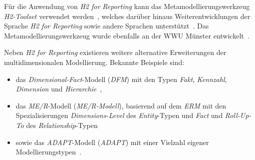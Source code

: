 \documentclass[
  language=german, %
  type=bachelor,%
  ngerman
]{isthesis}
\begin{document}
\begin{content}
	Für die Anwendung von \textit{H2 for Reporting} kann das
	Metamodellierungswerkzeug \textit{H2-Toolset} verwendet werden~\cite[][S.
	33]{fleischer2013konstruktion}, welches darüber hinaus Weiterentwicklungen
	der Sprache \textit{H2 for Reporting} sowie andere Sprachen
	unterstützt~\cite[][S. 86]{becker2012fachkonzeptionelle}. Das
	Metamodellierungswerkzeug wurde ebenfalls an der \acrshort{WWU} Münster
	entwickelt~\cite[][S.  34]{becker2007h2}.


	Neben \textit{H2 for Reporting} existieren weitere alternative Erweiterungen
	der multidimensionalen Modellierung. Bekannte Beispiele sind:

  \begin{itemize}
    \item das \textit{Dimensional-Fact}-Modell (\textit{\acrshort{DFM}}) mit den Typen
      \textit{Fakt}, \textit{Kennzahl}, \textit{Dimension} und
      \textit{Hierarchie}~\cite[][]{golfarelli1998dimensional}, 
    \item das \textit{\acrlong{ME/R}}-Modell (\textit{\acrshort{ME/R}-Modell}), basierend
      auf dem \textit{\acrlong{ERM}} mit den Spezialisierungen
      \textit{Dimensions-Level} des \textit{Entity}-Typen und \textit{Fact} und
      \textit{Roll-Up-To} des
      \textit{Relationship}-Typen~\cite[][]{sapia1998extending}
    \item sowie das
      \textit{\acrlong{ADAPT}}-Modell (\textit{\acrshort{ADAPT}}) mit einer
      Vielzahl eigener Modellierungstypen~\cite[][]{chamoni2013analytische}.
  \end{itemize}





\end{content}
\end{document}
